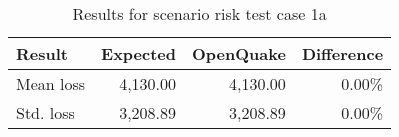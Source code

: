 \begin{table}[htbp]

\centering
\begin{tabular}{ l r r r }

\hline
\rowcolor{anti-flashwhite}
\bf{Result} & \bf{Expected} & \bf{OpenQuake} & \bf{Difference}\\
\hline
Mean loss & 4,130.00 & 4,130.00 & 0.00\% \\
Std. loss & 3,208.89 & 3,208.89 & 0.00\% \\
\hline
\end{tabular}

\caption{Results for scenario risk test case 1a}
\label{tab:result-sr-1a}
\end{table}